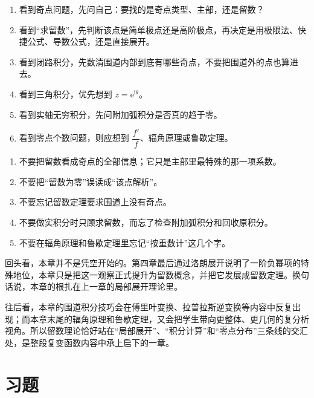 \begin{tishi}[做题时的判断思路]
\begin{enumerate}
    \item 看到奇点问题，先问自己：要找的是奇点类型、主部，还是留数？
    \item 看到``求留数''，先判断该点是简单极点还是高阶极点，再决定是用极限法、快捷公式、导数公式，还是直接展开。
    \item 看到闭路积分，先数清围道内部到底有哪些奇点，不要把围道外的点也算进去。
    \item 看到三角积分，优先想到 $z=\mathrm{e}^{\mathrm{i}\theta}$。
    \item 看到实轴无穷积分，先问附加弧积分是否真的趋于零。
    \item 看到零点个数问题，则应想到 $\dfrac{f'}{f}$、辐角原理或鲁歇定理。
\end{enumerate}
\end{tishi}

\begin{jinshi}[本章最容易混淆的地方]
\begin{enumerate}
    \item 不要把留数看成奇点的全部信息；它只是主部里最特殊的那一项系数。
    \item 不要把``留数为零''误读成``该点解析''。
    \item 不要忘记留数定理要求围道上没有奇点。
    \item 不要做实积分时只顾求留数，而忘了检查附加弧积分和回收原积分。
    \item 不要在辐角原理和鲁歇定理里忘记``按重数计''这几个字。
\end{enumerate}
\end{jinshi}

\begin{tishi}[和前后内容的联系]
回头看，本章并不是凭空开始的。第四章最后通过洛朗展开说明了一阶负幂项的特殊地位，本章只是把这一观察正式提升为留数概念，并把它发展成留数定理。换句话说，本章的根扎在上一章的局部展开理论里。

往后看，本章的围道积分技巧会在傅里叶变换、拉普拉斯逆变换等内容中反复出现；而本章末尾的辐角原理和鲁歇定理，又会把学生带向更整体、更几何的复分析视角。所以留数理论恰好站在``局部展开''、``积分计算''和``零点分布''三条线的交汇处，是整段复变函数内容中承上启下的一章。
\end{tishi}

\section{习题}

